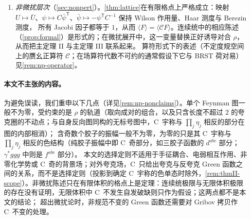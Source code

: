 \documentclass[UTF8,a4paper,11pt,fontset=fandol]{ctexart}
\theoremstyle{cplain}
\theoremstyle{cdefinition}
\theoremstyle{cremark}
\numberwithin{equation}{section}
\newcommand{\tp}{\mathsf{T}}                         %
\newcommand{\Cop}{\mathcal{C}}                       %
\begin{document}
\begin{enumerate}[label=(\arabic*),leftmargin=2em,itemsep=2pt,topsep=3pt,beginpenalty=10000]
它在坐标空间中由 (R1) 逐点给出（正规化传播子须在顶点重合处也有定义），在动量空间中由 (R2) 对自反向圈的要求保证（\cref{rem:reg-selfreverse}）。
由此得到的选择定则（\cref{cor:selection}）分为两类：不依赖不变张量分类的正交性陈述，以及在整体 $\mathrm{SU}(N)$ 不变性之下的完整形式。
\item \emph{非微扰层次}（\cref{sec:nonpert}）。\cref{thm:lattice}在有限格点上严格成立：映射 $U\mapsto\overline U$、$\psi\mapsto C\bar\psi^{\tp}$、$\bar\psi\mapsto-\psi^{\tp}C^{-1}$ 保持 Wilson 作用量、Haar 测度与 Berezin 测度，
所有 Jacobi 因子都等于 $1$，从而 $\langle F\rangle=\langle\Cop F\rangle$。连续统中的相应陈述（\cref{prop:formal}）是形式的；在微扰展开中，这一变量替换正好诱导对合 $\rho$，从而把主定理 II 与主定理 III 联系起来。
算符形式下的表述（不定度规空间上的赝幺正算符 $\Cop$；在场算符代数不可约的通常假设下它与 BRST 荷对易）见\cref{rem:np-operator}。
\end{enumerate}

\paragraph{本文不主张的内容。}
为避免误读，我们重申以下几点（详见\cref{rem:np-nonclaims}）。单个 Feynman 图一般不为零，受约束的是 $\rho$ 的轨道（取向成对的组合，以及只含长度不超过 $2$ 的夸克圈的不动点；与自身反向图同构的无标号图中，C~宇称与 $\prod_j\eta_j$ 相反的部分在图的内部相消）；
含奇数个胶子的振幅一般不为零，为零的只是其 C~宇称与 $\prod_j\eta_j$ 相反的色结构（纯胶子振幅中即 C~奇部分，如三胶子函数的 $d^{abc}$ 部分；$\gamma^*ggg$ 中则是 $f^{abc}$ 部分）。
本文的选择定则不适用于手征耦合、电弱相互作用、非零化学势或 C~奇的背景场；对外夸克场，C~只给出夸克与反夸克 Green 函数之间的关系，而不是选择定则（投影到确定 C~宇称的色单态时除外，\cref{rem:thmII-scope}）。非微扰陈述只在有限体积的格点上是定理：连续统极限与无限体积极限的存在没有证明，无限体积中 C~不发生自发破缺则只作为假设；这两点都不是本文的结论；
超出微扰论时，非规范不变的 Green 函数还需要对 Gribov 拷贝作 C~不变的处理。
\end{document}
